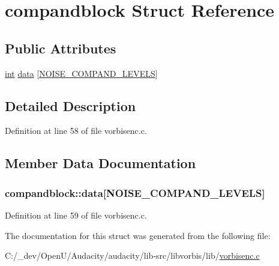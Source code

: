 \hypertarget{structcompandblock}{}\section{compandblock Struct Reference}
\label{structcompandblock}
\subsection*{Public Attributes}
\begin{DoxyCompactItemize}
\item 
\hyperlink{xmltok_8h_a5a0d4a5641ce434f1d23533f2b2e6653}{int} \hyperlink{structcompandblock_ac6dc1324ecb4f1172c8bde3ae48ed9ab}{data} \mbox{[}\hyperlink{psy_8h_a370d177dee7c7401b0c46ed37310d54b}{N\+O\+I\+S\+E\+\_\+\+C\+O\+M\+P\+A\+N\+D\+\_\+\+L\+E\+V\+E\+LS}\mbox{]}
\end{DoxyCompactItemize}


\subsection{Detailed Description}


Definition at line 58 of file vorbisenc.\+c.



\subsection{Member Data Documentation}
\subsubsection[{\texorpdfstring{data}{data}}]{ compandblock\+::data\mbox{[}{\bf N\+O\+I\+S\+E\+\_\+\+C\+O\+M\+P\+A\+N\+D\+\_\+\+L\+E\+V\+E\+LS}\mbox{]}}\hypertarget{structcompandblock_ac6dc1324ecb4f1172c8bde3ae48ed9ab}{}\label{structcompandblock_ac6dc1324ecb4f1172c8bde3ae48ed9ab}


Definition at line 59 of file vorbisenc.\+c.



The documentation for this struct was generated from the following file\+:\begin{DoxyCompactItemize}
\item 
C\+:/\+\_\+dev/\+Open\+U/\+Audacity/audacity/lib-\/src/libvorbis/lib/\hyperlink{vorbisenc_8c}{vorbisenc.\+c}\end{DoxyCompactItemize}
